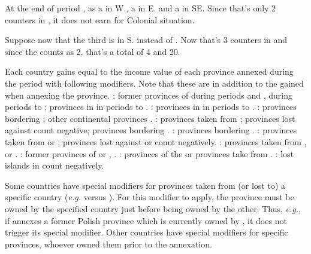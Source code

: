\begin{exemple}
  At the end of period , \POR as a \COL\faceplus in
  \granderegionRecife W., a \COL \facemoins in \granderegionBelem E. and a
  \COL \facemoins in \granderegionAmazonia SE. Since that's only 2 \COL
  counters in \continentBrazil, it does not earn \VPs for Colonial situation.

  Suppose now that the third \COL is in \granderegionRio S. instead of
  \granderegionAmazonia. Now that's 3 counters in \continentBrazil and since
  the \COL\faceplus counts as 2, that's a total of 4 \COL and 20\VPs.
\end{exemple}

 Each country gains \VPs equal to the income value
of each province annexed during the period with following modifiers. Note that
these are in addition to the \VPs gained when annexing the province.
\bparag \FRA: former provinces of \paysBourgogne {} during
periods  and ,  during periods
 to ; provinces in \regionItalie {}
in periods  to .
\bparag \SPA: provinces in \regionItalie {} in periods
 to .
\bparag \ENG: provinces bordering \regionMediterranee {};
other continental provinces .
\bparag \TUR: provinces taken from \paysPerse {}; provinces
lost against \paysPerse count negative; provinces bordering
\regionMediterranee {}.
\bparag \SUE: provinces bordering \regionBaltique {}.
\bparag \RUS: provinces taken from \POL or \paysPologne {} ;
provinces lost against \POL or \paysPologne count negatively.
\bparag \POL: provinces taken from \RUS, \SUE or
\paysSuede{}.
\bparag \AUS: former provinces of \paysHongrie or \paysMoldavie,
\provinceSerbia {}.
\bparag \PRU: provinces of the \HRE or provinces take from \paysPologne
{}.
\bparag \VEN: lost islands in \regionMediterranee count negatively.

\aparag Some countries have special modifiers for provinces taken from
(or lost to) a specific country (\emph{e.g.} \RUS versus \POL). For this
modifier to apply, the province must be owned by the specified country
just before being owned by the other.
\bparag Thus, \emph{e.g.}, if \RUS annexes a former Polish province
which is currently owned by \SUE, it does not trigger its special
modifier.
\bparag Other countries have special modifiers for specific provinces,
whoever owned them prior to the annexation.

